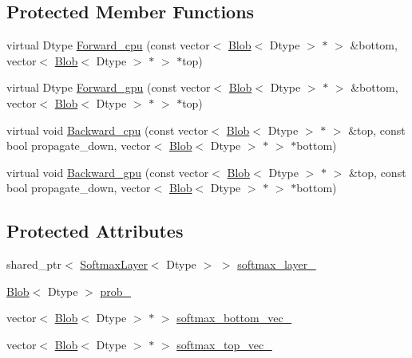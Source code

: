 \subsection*{Protected Member Functions}
\begin{DoxyCompactItemize}
\item 
virtual Dtype \hyperlink{classcaffe_1_1_softmax_with_loss_layer_a898274f4130f8180dca39b573726f8f8}{Forward\+\_\+cpu} (const vector$<$ \hyperlink{classcaffe_1_1_blob}{Blob}$<$ Dtype $>$ $\ast$ $>$ \&bottom, vector$<$ \hyperlink{classcaffe_1_1_blob}{Blob}$<$ Dtype $>$ $\ast$ $>$ $\ast$top)
\item 
virtual Dtype \hyperlink{classcaffe_1_1_softmax_with_loss_layer_a38d8051ca05ca2dbb1af137d6ce42a42}{Forward\+\_\+gpu} (const vector$<$ \hyperlink{classcaffe_1_1_blob}{Blob}$<$ Dtype $>$ $\ast$ $>$ \&bottom, vector$<$ \hyperlink{classcaffe_1_1_blob}{Blob}$<$ Dtype $>$ $\ast$ $>$ $\ast$top)
\item 
virtual void \hyperlink{classcaffe_1_1_softmax_with_loss_layer_ae969bcf16c6d99070e18d669053f8587}{Backward\+\_\+cpu} (const vector$<$ \hyperlink{classcaffe_1_1_blob}{Blob}$<$ Dtype $>$ $\ast$ $>$ \&top, const bool propagate\+\_\+down, vector$<$ \hyperlink{classcaffe_1_1_blob}{Blob}$<$ Dtype $>$ $\ast$ $>$ $\ast$bottom)
\item 
virtual void \hyperlink{classcaffe_1_1_softmax_with_loss_layer_a5274ccce6a8850e7bb61ac64ade39c8a}{Backward\+\_\+gpu} (const vector$<$ \hyperlink{classcaffe_1_1_blob}{Blob}$<$ Dtype $>$ $\ast$ $>$ \&top, const bool propagate\+\_\+down, vector$<$ \hyperlink{classcaffe_1_1_blob}{Blob}$<$ Dtype $>$ $\ast$ $>$ $\ast$bottom)
\end{DoxyCompactItemize}
\subsection*{Protected Attributes}
\begin{DoxyCompactItemize}
\item 
shared\+\_\+ptr$<$ \hyperlink{classcaffe_1_1_softmax_layer}{Softmax\+Layer}$<$ Dtype $>$ $>$ \hyperlink{classcaffe_1_1_softmax_with_loss_layer_ad5d63b5be7be681045f4e901de667035}{softmax\+\_\+layer\+\_\+}
\item 
\hyperlink{classcaffe_1_1_blob}{Blob}$<$ Dtype $>$ \hyperlink{classcaffe_1_1_softmax_with_loss_layer_a02669f20097006452d877ea05e98b775}{prob\+\_\+}
\item 
vector$<$ \hyperlink{classcaffe_1_1_blob}{Blob}$<$ Dtype $>$ $\ast$ $>$ \hyperlink{classcaffe_1_1_softmax_with_loss_layer_aa39f89b673da5e6f86c6b1f79ced1270}{softmax\+\_\+bottom\+\_\+vec\+\_\+}
\item 
vector$<$ \hyperlink{classcaffe_1_1_blob}{Blob}$<$ Dtype $>$ $\ast$ $>$ \hyperlink{classcaffe_1_1_softmax_with_loss_layer_a0fd219e185b46acce8fd74cb71dabf44}{softmax\+\_\+top\+\_\+vec\+\_\+}
\end{DoxyCompactItemize}



